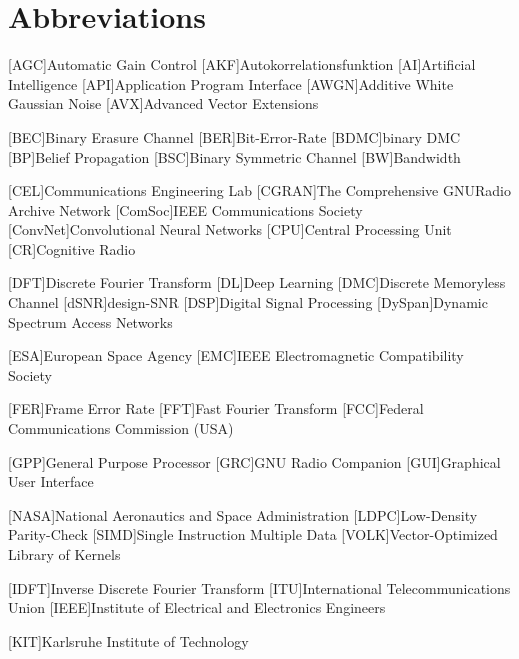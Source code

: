 \chapter{Abbreviations}
\begin{acronym}[TROLLLLL] %
  [AGC]{Automatic Gain Control}
  [AKF]{Autokorrelationsfunktion}
  [AI]{Artificial Intelligence}
  [API]{Application Program Interface}
  [AWGN]{Additive White Gaussian Noise}
  [AVX]{Advanced Vector Extensions}

  [BEC]{Binary Erasure Channel}
  [BER]{Bit-Error-Rate}
  [BDMC]{binary \acs{DMC}}
  [BP]{Belief Propagation}
  [BSC]{Binary Symmetric Channel}
  [BW]{Bandwidth}

  [CEL]{Communications Engineering Lab}
  [CGRAN]{The Comprehensive GNURadio Archive Network}
  [ComSoc]{IEEE Communications Society}
  [ConvNet]{Convolutional Neural Networks}
  [CPU]{Central Processing Unit}
  [CR]{Cognitive Radio}

  [DFT]{Discrete Fourier Transform}
  [DL]{Deep Learning}
  [DMC]{Discrete Memoryless Channel}
  [dSNR]{design-\ac{SNR}}
  [DSP]{Digital Signal Processing}
  [DySpan]{Dynamic Spectrum Access Networks}

  [ESA]{European Space Agency}
  [EMC]{IEEE Electromagnetic Compatibility Society}

  [FER]{Frame Error Rate}
  [FFT]{Fast Fourier Transform}
  [FCC]{Federal Communications Commission (USA)}

  [GPP]{General Purpose Processor}
  [GRC]{GNU Radio Companion}
  [GUI]{Graphical User Interface}

  [NASA]{National Aeronautics and Space Administration}
  [LDPC]{Low-Density Parity-Check}
  [SIMD]{Single Instruction Multiple Data}
  [VOLK]{Vector-Optimized Library of Kernels}

  [IDFT]{Inverse Discrete Fourier Transform}
  [ITU]{International Telecommunications Union}
  [IEEE]{Institute of Electrical and Electronics Engineers}

  [KIT]{Karlsruhe Institute of Technology}


\end{acronym}
